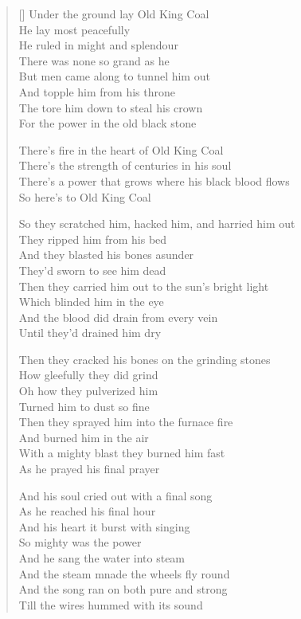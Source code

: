 \pagebreak
\settowidth{\versewidth}{There's a power that grows where his black blood flows}
\begin{verse}[\versewidth]
Under the ground lay Old King Coal\\
He lay most peacefully\\
He ruled in might and splendour\\
There was none so grand as he\\
But men came along to tunnel him out\\
And topple him from his throne\\
The tore him down to steal his crown\\
For the power in the old black stone

\begin{chorus}
There's fire in the heart of Old King Coal\\
There's the strength of centuries in his soul\\
There's a power that grows where his black blood flows\\
So here's to Old King Coal
\end{chorus}

So they scratched him, hacked him, and harried him out\\
They ripped him from his bed\\
And they blasted his bones asunder\\
They'd sworn to see him dead\\
Then they carried him out to the sun's bright light\\
Which blinded him in the eye\\
And the blood did drain from every vein\\
Until they'd drained him dry

Then they cracked his bones on the grinding stones\\
How gleefully they did grind\\
Oh how they pulverized him\\
Turned him to dust so fine\\
Then they sprayed him into the furnace fire\\
And burned him in the air\\
With a mighty blast they burned him fast\\
As he prayed his final prayer

And his soul cried out with a final song\\
As he reached his final hour\\
And his heart it burst with singing\\
So mighty was the power\\
And he sang the water into steam\\
And the steam mnade the wheels fly round\\
And the song ran on both pure and strong\\
Till the wires hummed with its sound


\end{verse}
